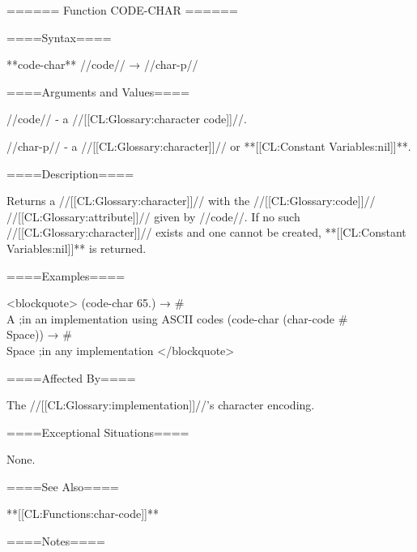====== Function CODE-CHAR ======

====Syntax====

**code-char** //code// → //char-p//

====Arguments and Values====

//code// - a //[[CL:Glossary:character code]]//.

//char-p// - a //[[CL:Glossary:character]]// or **[[CL:Constant Variables:nil]]**.

====Description====

Returns a //[[CL:Glossary:character]]// with the //[[CL:Glossary:code]]// //[[CL:Glossary:attribute]]// given by //code//. If no such //[[CL:Glossary:character]]// exists and one cannot be created, **[[CL:Constant Variables:nil]]** is returned.

====Examples====

<blockquote> (code-char 65.) → #\\A ;in an implementation using ASCII codes (code-char (char-code #\\Space)) → #\\Space ;in any implementation </blockquote>

====Affected By====

The //[[CL:Glossary:implementation]]//'s character encoding.

====Exceptional Situations====

None.

====See Also====

**[[CL:Functions:char-code]]**

====Notes====

